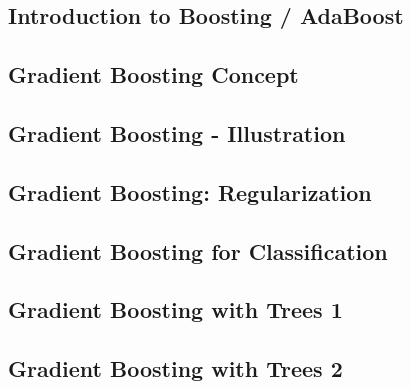 




\subsection{Introduction to Boosting / AdaBoost}


\subsection{Gradient Boosting Concept}


\subsection{Gradient Boosting - Illustration}


\subsection{Gradient Boosting: Regularization}


\subsection{Gradient Boosting for Classification}


\subsection{Gradient Boosting with Trees 1}


\subsection{Gradient Boosting with Trees 2}


